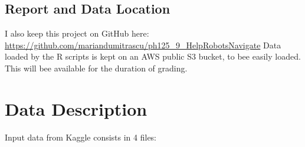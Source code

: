 \documentclass[]{article}
\begin{document}
\hypertarget{report-and-data-location}{%
\subsection{Report and Data Location}\label{report-and-data-location}}

I also keep this project on GitHub here:
\url{https://github.com/mariandumitrascu/ph125_9_HelpRobotsNavigate}
Data loaded by the R scripts is kept on an AWS public S3 bucket, to bee
easily loaded. This will bee available for the duration of grading.

\hypertarget{data-description}{%
\section{Data Description}\label{data-description}}

Input data from Kaggle consists in 4 files:
\end{document}
